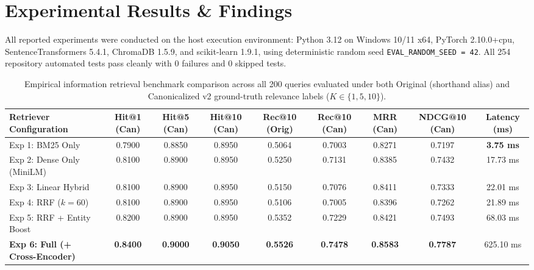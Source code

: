 \documentclass[10pt,twocolumn]{article}
\begin{document}
\section{Experimental Results \& Findings}
\label{sec:results}

All reported experiments were conducted on the host execution environment: Python 3.12 on Windows 10/11 x64, PyTorch 2.10.0+cpu, SentenceTransformers 5.4.1, ChromaDB 1.5.9, and scikit-learn 1.9.1, using deterministic random seed \texttt{EVAL\_RANDOM\_SEED = 42}. All 254 repository automated tests pass cleanly with 0 failures and 0 skipped tests.

\begin{table}[t]
\centering
\small
\caption{Empirical information retrieval benchmark comparison across all 200 queries evaluated under both Original (shorthand alias) and Canonicalized v2 ground-truth relevance labels ($K \in \{1, 5, 10\}$).}
\begin{tabularx}{\textwidth}{lcccccccc}
\toprule
\textbf{Retriever Configuration} & \textbf{Hit@1 (Can)} & \textbf{Hit@5 (Can)} & \textbf{Hit@10 (Can)} & \textbf{Rec@10 (Orig)} & \textbf{Rec@10 (Can)} & \textbf{MRR (Can)} & \textbf{NDCG@10 (Can)} & \textbf{Latency (ms)} \\
\midrule
Exp 1: BM25 Only              & 0.7900 & 0.8850 & 0.8950 & 0.5064 & 0.7003 & 0.8271 & 0.7197 & \textbf{3.75 ms} \\
Exp 2: Dense Only (MiniLM)    & 0.8100 & 0.8900 & 0.8950 & 0.5250 & 0.7131 & 0.8385 & 0.7432 & 17.73 ms \\
Exp 3: Linear Hybrid          & 0.8100 & 0.8900 & 0.8950 & 0.5150 & 0.7076 & 0.8411 & 0.7333 & 22.01 ms \\
Exp 4: RRF ($k=60$)           & 0.8100 & 0.8900 & 0.8950 & 0.5106 & 0.7005 & 0.8396 & 0.7262 & 21.89 ms \\
Exp 5: RRF + Entity Boost     & 0.8200 & 0.8900 & 0.8950 & 0.5352 & 0.7229 & 0.8421 & 0.7493 & 68.03 ms \\
\textbf{Exp 6: Full (+ Cross-Encoder)} & \textbf{0.8400} & \textbf{0.9000} & \textbf{0.9050} & \textbf{0.5526} & \textbf{0.7478} & \textbf{0.8583} & \textbf{0.7787} & 625.10 ms \\
\bottomrule
\end{tabularx}
\label{tab:ir_results}
\end{table}
\end{document}
